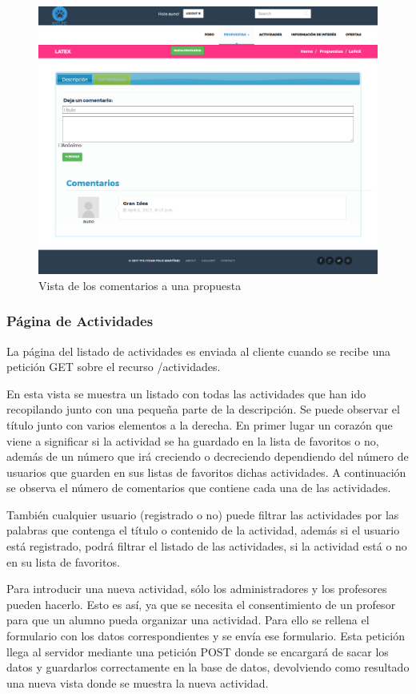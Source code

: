 \begin{figure}[H]
   \centering
   \includegraphics[width=12cm]{img/propuesta_comment}
   \caption{Vista de los comentarios a una propuesta}
   \label{figura:propuesta_comment}
\end{figure}

\subsubsection{Página de Actividades}
\label{subsubsec:actividades}


La página del listado de actividades es enviada al cliente cuando se recibe una petición GET sobre el recurso /actividades.


En esta vista se muestra un listado con todas las actividades que han ido recopilando junto con una pequeña parte de la descripción. Se puede observar el título junto con varios elementos a la derecha. En primer lugar un corazón que viene a significar si la actividad se ha guardado en la lista de favoritos o no, además de un número que irá creciendo o decreciendo dependiendo del número de usuarios que guarden en sus listas de favoritos dichas actividades. A continuación se observa el número de comentarios que contiene cada una de las actividades.


También cualquier usuario (registrado o no) puede filtrar las actividades por las palabras que contenga el título o contenido de la actividad, además si el usuario está registrado, podrá filtrar el listado de las actividades, si la actividad está o no en su lista de favoritos.


Para introducir una nueva actividad, sólo los administradores y los profesores pueden hacerlo. Esto es así, ya que se necesita el consentimiento de un profesor para que un alumno pueda organizar una actividad. Para ello se rellena el formulario con los datos correspondientes y se envía ese formulario. Esta petición llega al servidor mediante una petición POST donde se encargará de sacar los datos y guardarlos correctamente en la base de datos, devolviendo como resultado una nueva vista donde se muestra la nueva actividad.


